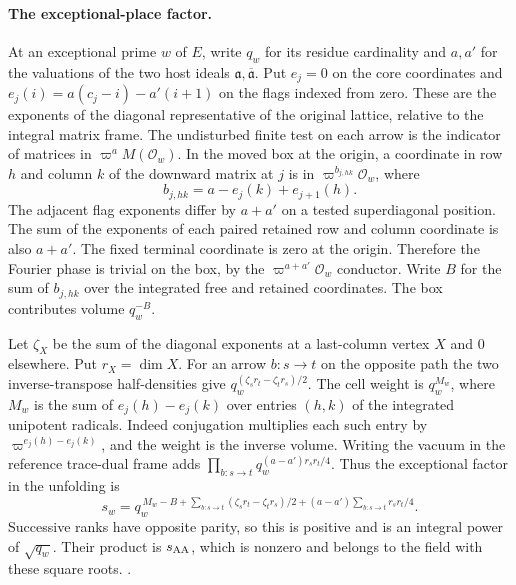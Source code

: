 \paragraph{The exceptional-place factor.}
At an exceptional prime \(w\) of \(E\), write \(q_w\) for its
residue cardinality and \(a,a'\) for the valuations of the
two host ideals \(\mathfrak a,\overline{\mathfrak a}\). Put
\(e_j=0\) on the core coordinates and
\(e_j(i)=a(c_j-i)-a'(i+1)\) on the flags indexed from zero.
These are the exponents of the diagonal representative of
the original lattice, relative to the integral matrix frame.
The undisturbed finite test on each arrow is the indicator
of matrices in \(\varpi^a M(\mathcal O_w)\). In the moved
box at the origin, a coordinate in row \(h\) and column \(k\)
of the downward matrix at \(j\) is in
\(\varpi^{b_{j,hk}}\mathcal O_w\), where
\[
 b_{j,hk}=a-e_j(k)+e_{j+1}(h).
\]
The adjacent flag exponents differ by \(a+a'\) on a tested
superdiagonal position. The sum of the exponents of each
paired retained row and column coordinate is also \(a+a'\).
The fixed terminal coordinate is zero at the origin.
Therefore the Fourier phase is trivial on the box, by the
\(\varpi^{a+a'}\mathcal O_w\) conductor. Write \(B\) for the
sum of \(b_{j,hk}\) over the integrated free and retained
coordinates. The box contributes volume \(q_w^{-B}\).

Let \(\zeta_X\) be the sum of the diagonal exponents at a
last-column vertex \(X\) and \(0\) elsewhere. Put \(r_X=\dim X\).
For an arrow \(b:s\to t\) on the opposite path the two
inverse-transpose half-densities give
\(q_w^{(\zeta_s r_t-\zeta_t r_s)/2}\). The cell weight is
\(q_w^{M_w}\), where \(M_w\) is the sum of \(e_j(h)-e_j(k)\)
over entries \((h,k)\) of the integrated unipotent radicals.
Indeed conjugation multiplies each such entry by
\(\varpi^{e_j(h)-e_j(k)}\), and the weight is the inverse volume.
Writing the vacuum in the reference trace-dual frame adds
\(\prod_{b:s\to t}q_w^{(a-a')r_s r_t/4}\).
Thus the exceptional factor in the unfolding is
\[
 s_w=q_w^{\,M_w-B+
         \sum_{b:s\to t}(\zeta_s r_t-\zeta_t r_s)/2+
         (a-a')\sum_{b:s\to t}r_sr_t/4}.
\]
Successive ranks have opposite parity, so this is positive
and is an integral power of \(\sqrt{q_w}\).
Their product is \(s_{\rm AA}\), which is nonzero and
belongs to the field with these square roots.
.


